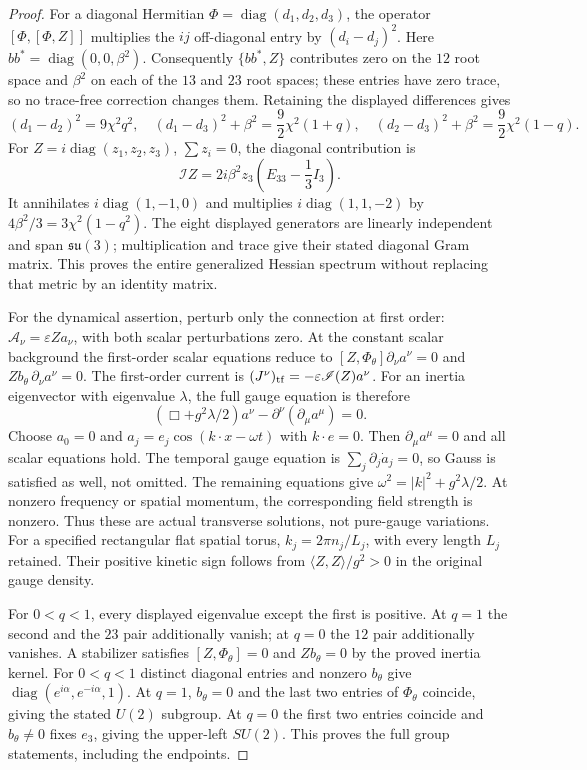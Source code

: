 \begin{proof}
For a diagonal Hermitian $\Phi=\operatorname{diag}(d_1,d_2,d_3)$,
the operator $[\Phi,[\Phi,Z]]$ multiplies the $ij$ off-diagonal entry
by $(d_i-d_j)^2$. Here $bb^*=\operatorname{diag}(0,0,\beta^2)$.
Consequently $\{bb^*,Z\}$ contributes zero on the $12$ root space
and $\beta^2$ on each of the $13$ and $23$ root spaces; these entries
have zero trace, so no trace-free correction changes them. Retaining
the displayed differences gives
\[
 (d_1-d_2)^2=9\chi^2q^2,\quad
 (d_1-d_3)^2+\beta^2=\frac92\chi^2(1+q),\quad
 (d_2-d_3)^2+\beta^2=\frac92\chi^2(1-q).
\]
For $Z=i\operatorname{diag}(z_1,z_2,z_3)$, $\sum z_i=0$, the
diagonal contribution is
\[
 \mathscr I Z=2i\beta^2z_3
       \left(E_{33}-\frac13I_3\right).
\]
It annihilates $i\operatorname{diag}(1,-1,0)$ and multiplies
$i\operatorname{diag}(1,1,-2)$ by $4\beta^2/3
=3\chi^2(1-q^2)$. The eight displayed generators are linearly
independent and span $\mathfrak{su}(3)$; multiplication and trace give
their stated diagonal Gram matrix. This proves the entire generalized
Hessian spectrum without replacing that metric by an identity matrix.

For the dynamical assertion, perturb only the connection at first order:
$\mathcal A_\nu=\varepsilon Z a_\nu$, with both scalar perturbations zero.
At the constant scalar background the first-order scalar equations
reduce to
$[Z,\Phi_\theta]\partial_\nu a^\nu=0$ and
$Zb_\theta\,\partial_\nu a^\nu=0$.
The first-order current is
$(J^\nu)_{\rm tf}=-\varepsilon\mathscr I(Z)a^\nu$.
For an inertia eigenvector with eigenvalue $\lambda$, the full gauge
equation is therefore
\[
 (\Box+g^2\lambda/2)a^\nu-\partial^\nu(\partial_\mu a^\mu)=0.
                                                               \tag{GS.3}
\]
Choose $a_0=0$ and
$a_j=e_j\cos(k\cdot x-\omega t)$ with $k\cdot e=0$.
Then $\partial_\mu a^\mu=0$ and all scalar equations hold. The temporal
gauge equation is $\sum_j\partial_j\dot a_j=0$, so Gauss is satisfied
as well, not omitted. The remaining equations give
$\omega^2=|k|^2+g^2\lambda/2$. At nonzero frequency or spatial momentum,
the corresponding field strength is nonzero. Thus these are actual
transverse solutions, not pure-gauge variations.
For a specified rectangular flat spatial torus,
$k_j=2\pi n_j/L_j$, with every length $L_j$ retained.
Their positive kinetic sign follows from
$\langle Z,Z\rangle/g^2>0$ in the original gauge density.

For $0<q<1$, every displayed eigenvalue except the first is positive.
At $q=1$ the second and the $23$ pair additionally vanish; at $q=0$
the $12$ pair additionally vanishes. A stabilizer satisfies
$[Z,\Phi_\theta]=0$ and $Zb_\theta=0$ by the proved inertia kernel.
For $0<q<1$ distinct diagonal entries and nonzero $b_\theta$ give
$\operatorname{diag}(e^{i\alpha},e^{-i\alpha},1)$.
At $q=1$, $b_\theta=0$ and the last two entries of $\Phi_\theta$
coincide, giving the stated $U(2)$ subgroup. At $q=0$ the first two
entries coincide and $b_\theta\ne0$ fixes $e_3$, giving the upper-left
$SU(2)$. This proves the full group statements, including the endpoints.
\end{proof}

